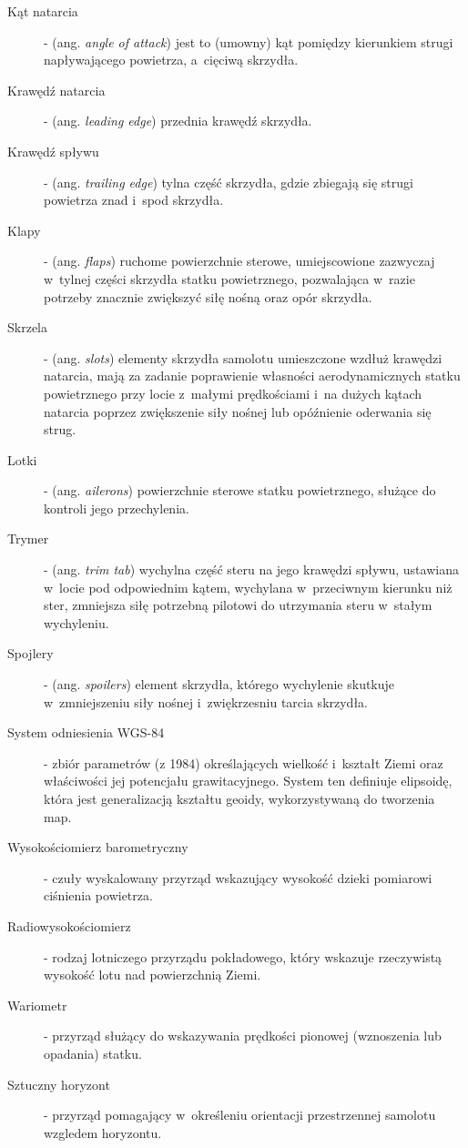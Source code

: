 \documentclass{mwrep}
\begin{document}
\begin{description}
\item[Kąt natarcia] - (ang. \emph{angle of attack}) jest to (umowny) kąt pomiędzy kierunkiem strugi napływającego powietrza, a~cięciwą skrzydła.
\item[Krawędź natarcia] - (ang. \emph{leading edge}) przednia krawędź skrzydła.
\item[Krawędź spływu] - (ang. \emph{trailing edge}) tylna część skrzydła, gdzie zbiegają się strugi powietrza znad i~spod skrzydła.
\item[Klapy] - (ang. \emph{flaps}) ruchome powierzchnie sterowe, umiejscowione zazwyczaj w~tylnej części skrzydła statku powietrznego, pozwalająca w~razie potrzeby znacznie zwiększyć siłę nośną oraz opór skrzydła.
\item[Skrzela] - (ang. \emph{slots}) elementy skrzydła samolotu umieszczone wzdłuż krawędzi natarcia, mają za zadanie poprawienie własności aerodynamicznych statku powietrznego przy locie z~małymi prędkościami i~na dużych kątach natarcia poprzez zwiększenie siły nośnej lub opóźnienie oderwania się strug.
\item[Lotki] - (ang. \emph{ailerons}) powierzchnie sterowe statku powietrznego, służące do kontroli jego przechylenia.
\item[Trymer] - (ang. \emph{trim tab}) wychylna część steru na jego krawędzi spływu, ustawiana w~locie pod odpowiednim kątem, wychylana w~przeciwnym kierunku niż ster, zmniejsza siłę potrzebną pilotowi do utrzymania steru w~stałym wychyleniu.
\item[Spojlery] - (ang. \emph{spoilers}) element skrzydła, którego wychylenie skutkuje w~zmniejszeniu siły nośnej i~zwiękrzesniu tarcia skrzydła.
\item[System odniesienia WGS-84] - zbiór parametrów (z 1984) określających wielkość i~kształt Ziemi oraz właściwości jej potencjału grawitacyjnego. System ten definiuje elipsoidę, która jest generalizacją kształtu geoidy, wykorzystywaną do tworzenia map.
\item[Wysokościomierz barometryczny] - czuły wyskalowany przyrząd wskazujący wysokość dzieki pomiarowi ciśnienia powietrza.
\item[Radiowysokościomierz] - rodzaj lotniczego przyrządu pokładowego, który wskazuje rzeczywistą wysokość lotu nad powierzchnią Ziemi.
\item[Wariometr] - przyrząd służący do wskazywania prędkości pionowej (wznoszenia lub opadania) statku.
\item[Sztuczny horyzont] - przyrząd pomagający w~określeniu orientacji przestrzennej samolotu wzgledem horyzontu.

\end{description}
\end{document}
